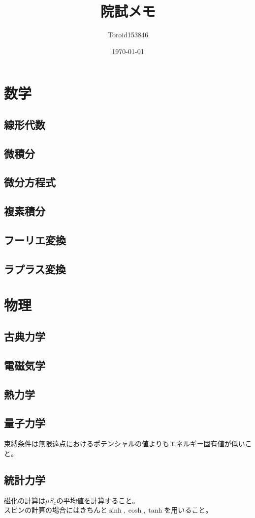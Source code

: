 \documentclass{ltjsarticle}
\title{院試メモ}
\author{Toroid153846}
\date{\today}
\begin{document}
\maketitle


  \section{数学}
  \subsection{線形代数}
  \subsection{微積分}
  \subsection{微分方程式}
  \subsection{複素積分}
  \subsection{フーリエ変換}
  \subsection{ラプラス変換}
  \section{物理}
  \subsection{古典力学}
  \subsection{電磁気学}
  \subsection{熱力学}
  \subsection{量子力学}
  束縛条件は無限遠点におけるポテンシャルの値よりもエネルギー固有値が低いこと。\\
  \subsection{統計力学}
  磁化の計算は$\mu S_z$の平均値を計算すること。\\
  スピンの計算の場合にはきちんと$\sinh,\cosh,\tanh$を用いること。\\
\end{document}
